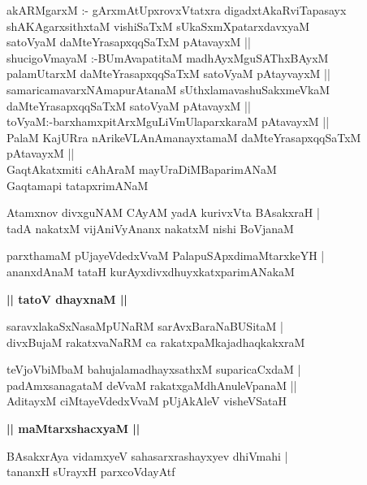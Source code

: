 \documentclass[twoside,12pt,openright]{book}
\newcounter{shloka}[chapter]
\def\uvaca#1{\centerline{{\large\textbf{#1}}}}
\begin{document}
\begin{shloka}%
akARMgarxM :- gArxmAtUpxrovxVtatxra digadxtAkaRviTapasayx \\
shAKAgarxsithxtaM vishiSaTxM sUkaSxmXpatarxdavxyaM \\
satoVyaM daMteYrasapxqqSaTxM pAtavayxM ||\\
shucigoVmayaM :-BUmAvapatitaM madhAyxMguSAThxBAyxM \\
palamUtarxM daMteYrasapxqqSaTxM satoVyaM pAtayvayxM ||\\
samaricamavarxNAmapurAtanaM sUthxlamavashuSakxmeVkaM \\
daMteYrasapxqqSaTxM satoVyaM pAtavayxM ||\\
toVyaM:-barxhamxpitArxMguLiVmUlaparxkaraM pAtavayxM ||\\
PalaM KajURra nArikeVLAnAmanayxtamaM daMteYrasapxqqSaTxM pAtavayxM ||\\
GaqtAkatxmiti cAhAraM mayUraDiMBaparimANaM \\
Gaqtamapi tatapxrimANaM
\end{shloka}

\begin{shloka}%
Atamxnov divxguNAM CAyAM yadA kurivxVta BAsakxraH |\\
tadA nakatxM vijAniVyAnanx nakatxM nishi BoVjanaM 
\end{shloka}

\begin{shloka}%
parxthamaM pUjayeVdedxVvaM PalapuSApxdimaMtarxkeYH |\\
ananxdAnaM tataH kurAyxdivxdhuyxkatxparimANakaM 
\end{shloka}

\uvaca{|| tatoV dhayxnaM ||}

\begin{shloka}%
saravxlakaSxNasaMpUNaRM sarAvxBaraNaBUSitaM |\\
divxBujaM rakatxvaNaRM ca rakatxpaMkajadhaqkakxraM \\
\end{shloka}

\begin{shloka}%
teVjoVbiMbaM bahujalamadhayxsathxM suparicaCxdaM |\\
padAmxsanagataM deVvaM rakatxgaMdhAnuleVpanaM ||\\
AditayxM ciMtayeVdedxVvaM pUjAkAleV visheVSataH
\end{shloka}

\uvaca{|| maMtarxshacxyaM ||}

\begin{shloka}%
BAsakxrAya vidamxyeV sahasarxrashayxyev dhiVmahi |\\
tananxH sUrayxH parxcoVdayAtf	
\end{shloka}
\end{document}
